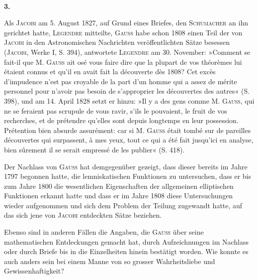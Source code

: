 \clearpage\begingroup{}
\begin{center}
\\
\par\medskip
\textbf{3.}\par\smallskip
{}
\end{center}
\noindent\hspace*{\parindent}Als \textsc{Jacobi} am 5. August 1827, auf Grund eines Briefes, den \textsc{Schumacher}
an ihn gerichtet hatte, \textsc{Legendre} mitteilte, \textsc{Gauss} habe schon 1808 einen Teil
der von \textsc{Jacobi} in den Astronomischen Nachrichten veröffentlichten Sätze besessen
(\textsc{Jacobi}, Werke I, S. 394), antwortete \textsc{Legendre} am 30. November:
»Comment se fait-il que M. \textsc{Gauss} ait osé vous faire dire que la plupart de
vos théorèmes lui étaient connus et qu’il en avait fait la découverte dès 1808?
Cet excès d’impudence n’est pas croyable de la part d’un homme qui a assez
de mérite personnel pour n’avoir pas besoin de s’approprier les découvertes des
autres« (S. 398), und am 14. April 1828 setzt er hinzu: »Il y a des gens comme
M. \textsc{Gauss}, qui ne se feraient pas scrupule de vous ravir, s’ils le pouvaient,
le fruit de vos recherches, et de prétendre qu’elles sont depuis longtemps en
leur possession. Prétention bien absurde assurément: car si M. \textsc{Gauss} était
tombé sur de pareilles découvertes qui surpassent, à mes yeux, tout ce qui a
été fait jusqu’ici en analyse, bien sûrement il se serait empressé de les publier«
(S. 418).
\par
Der Nachlass von \textsc{Gauss} hat demgegenüber gezeigt, dass dieser bereits
im Jahre 1797 begonnen hatte, die lemniskatischen Funktionen zu untersuchen,
dass er bis zum Jahre 1800 die wesentlichen Eigenschaften der allgemeinen
elliptischen Funktionen erkannt hatte und dass er im Jahre 1808 diese Untersuchungen
wieder aufgenommen und sich dem Problem der Teilung zugewandt
hatte, auf das sich jene von \textsc{Jacobi} entdeckten Sätze beziehen.
\par
Ebenso sind in anderen Fällen die Angaben, die \textsc{Gauss} über seine mathematischen
Entdeckungen gemacht hat, durch Aufzeichnungen im Nachlass oder
durch Briefe bis in die Einzelheiten hinein bestätigt worden. Wie konnte es
auch anders sein bei einem Manne von so grosser Wahrheitsliebe und Gewissenhaftigkeit?
